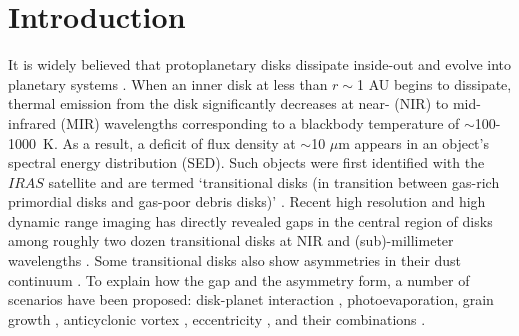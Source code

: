 \documentclass[apj]{emulateapj-rtx4}
\begin{document}
  \section{Introduction}\label{sec:intro}
  It is widely believed that protoplanetary disks dissipate inside-out \citep[c.f.,][]{will11} 
  and evolve into planetary systems \citep[e.g.,][]{haya85}. When an inner disk at less than $r\sim$1 AU begins to dissipate, 
  thermal emission from the disk significantly decreases at near- (NIR) to mid-infrared (MIR) wavelengths corresponding to 
  a blackbody temperature of $\sim$100-1000~K.  As a result, a deficit of flux density at $\sim$10 $\mu$m appears in an object's spectral 
  energy distribution (SED).  Such objects were first identified with the $IRAS$ satellite \citep{stro89} and are termed  
  `transitional disks (in transition between gas-rich primordial disks and gas-poor debris disks)' \citep{calv05,espa14}.
  Recent high resolution and high dynamic range imaging has directly revealed gaps in the central region of disks
  among roughly two dozen transitional disks at NIR \citep[e.g.,][]{thal10,hash12,maya12,debe13,garu13,quan13} 
  and (sub)-millimeter wavelengths \citep[e.g.,][]{piet05,brow09,andr11,will11,fuka13,pere14}. 
  Some transitional disks also show asymmetries in their dust continuum \citep[e.g.,][]{brow09,pere14}.
  To explain how the gap and the asymmetry form,
  a number of scenarios have been proposed: disk-planet interaction \citep{papa07,zhu11,dods11}, 
  photoevaporation\citep{clar01,alex06,alex07}, grain growth \citep{dull05,birn12},
  anticyclonic vortex \citep{rega12}, eccentricity \citep{kley06,atai13},
  and their combinations 
  \citep[dust filtration; radiation pressure;][]{rice06,dong12a,zhu12,pini12,owen14}. 
  
\end{document}
